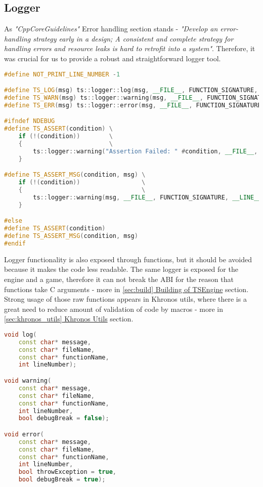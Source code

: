\newpage

\subsection{Logger}
\label{sec:logger}

\hspace{\parindent} As \textit{"CppCoreGuidelines"} \cite{CppCoreGuidelines} Error handling section stands - \textit{"Develop an error-handling strategy early in a design; A consistent and complete strategy for handling errors and resource leaks is hard to retrofit into a system"}. Therefore, it was crucial for us to provide a robust and straightforward logger tool.
\begin{lstlisting}[language=c++, caption=Logger macros (./engine/include/tsengine/logger.h)]
#define NOT_PRINT_LINE_NUMBER -1

#define TS_LOG(msg) ts::logger::log(msg, __FILE__, FUNCTION_SIGNATURE, __LINE__)
#define TS_WARN(msg) ts::logger::warning(msg, __FILE__, FUNCTION_SIGNATURE, __LINE__)
#define TS_ERR(msg) ts::logger::error(msg, __FILE__, FUNCTION_SIGNATURE, __LINE__)

#ifndef NDEBUG
#define TS_ASSERT(condition) \
    if (!(condition))        \
    {                        \
        ts::logger::warning("Assertion Failed: " #condition, __FILE__, FUNCTION_SIGNATURE, __LINE__, true); \
    }

#define TS_ASSERT_MSG(condition, msg) \
    if (!(condition))                 \
    {                                 \
        ts::logger::warning(msg, __FILE__, FUNCTION_SIGNATURE, __LINE__, true); \
    }

#else
#define TS_ASSERT(condition)
#define TS_ASSERT_MSG(condition, msg)
#endif
\end{lstlisting}

\newpage

Logger functionality is also exposed through functions, but it should be avoided because it makes the code less readable. The same logger is exposed for the engine and a game, therefore it can not break the ABI for the reason that functions take C arguments - more in \hyperref[sec:build]{\ref*{sec:build} Building of TSEngine} section.
Strong usage of those raw functions appears in Khronos utils, where there is a great need to reduce amount of validation of code by macros - more in \hyperref[sec:khronos_utils]{\ref*{sec:khronos_utils} Khronos Utils} section.
\begin{lstlisting}[language=c++, caption=Logger's functions (./engine/include/tsengine/logger.h)]
void log(
    const char* message,
    const char* fileName,
    const char* functionName,
    int lineNumber);

void warning(
    const char* message,
    const char* fileName,
    const char* functionName,
    int lineNumber,
    bool debugBreak = false);

void error(
    const char* message,
    const char* fileName,
    const char* functionName,
    int lineNumber,
    bool throwException = true,
    bool debugBreak = true);
\end{lstlisting}

